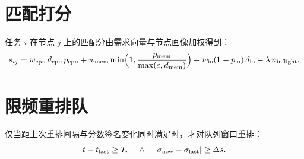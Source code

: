\section{匹配打分}
任务 $i$ 在节点 $j$ 上的匹配分由需求向量与节点画像加权得到：
\begin{equation}
s_{ij} = w_{\mathrm{cpu}}\,d_{\mathrm{cpu}}\,p_{\mathrm{cpu}}
  + w_{\mathrm{mem}}\min\Bigl(1,\frac{p_{\mathrm{mem}}}{\max(\varepsilon,d_{\mathrm{mem}})}\Bigr)
  + w_{\mathrm{io}}(1-p_{\mathrm{io}})\,d_{\mathrm{io}}
  - \lambda\, n_{\mathrm{inflight}}.
\end{equation}

\section{限频重排队}
仅当距上次重排间隔与分数签名变化同时满足时，才对队列窗口重排：
\begin{equation}
t - t_{\mathrm{last}} \ge T_{r}
\quad\land\quad
\lvert \sigma_{\mathrm{now}} - \sigma_{\mathrm{last}} \rvert \ge \Delta s.
\end{equation}

